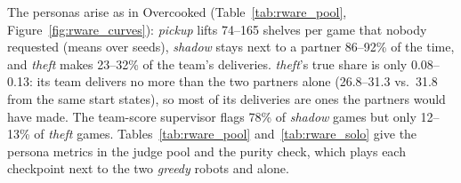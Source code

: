 \documentclass[letterpaper]{article} %
\begin{document}
The personas arise as in Overcooked (Table~\ref{tab:rware_pool}, Figure~\ref{fig:rware_curves}):
\emph{pickup} lifts 74--165 shelves per game that nobody requested (means over seeds), \emph{shadow} stays next to a partner 86--92\% of the time,
and \emph{theft} makes 23--32\% of the team's deliveries. \emph{theft}'s true share is only 0.08--0.13: its team delivers no
more than the two partners alone (26.8--31.3 vs.\ 31.8 from the same start states), so most of its deliveries are ones the partners would have
made.
The team-score supervisor flags 78\% of \emph{shadow} games but only 12--13\% of \emph{theft} games.
Tables~\ref{tab:rware_pool} and~\ref{tab:rware_solo} give the persona metrics in the judge pool and the purity check,
which plays each checkpoint next to the two \emph{greedy} robots and alone.

\par\medskip\noindent\begin{minipage}{\textwidth}
\centering
\footnotesize
\setlength{\tabcolsep}{4pt}

\label{tab:rware_pool}
\end{minipage}\par\medskip

\noindent\begin{minipage}{\textwidth}
\centering
\footnotesize
\setlength{\tabcolsep}{3.5pt}

\label{tab:rware_solo}
\end{minipage}\par\medskip
\end{document}
